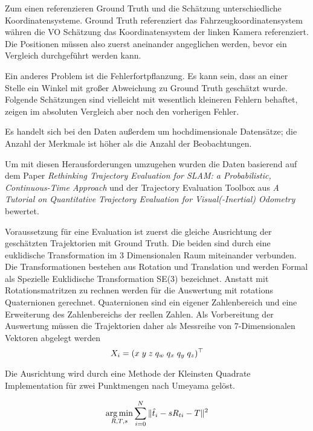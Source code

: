 Zum einen referenzieren Ground Truth und die Schätzung unterschiedliche Koordinatensysteme. Ground Truth referenziert das Fahrzeugkoordinatensystem währen die VO Schätzung das Koordinatensystem der linken Kamera referenziert. Die Positionen müssen also zuerst aneinander angeglichen werden, bevor ein Vergleich durchgeführt werden kann. 
\newline

Ein anderes Problem ist die Fehlerfortpflanzung. Es kann sein, dass an einer Stelle ein Winkel mit gro{\ss}er Abweichung zu Ground Truth geschätzt wurde. Folgende Schätzungen sind vielleicht mit wesentlich kleineren Fehlern behaftet, zeigen im absoluten Vergleich aber noch den vorherigen Fehler. 

Es handelt sich bei den Daten au{\ss}erdem um hochdimensionale Datensätze; die Anzahl der Merkmale ist höher als die Anzahl der Beobachtungen.
\newline

Um mit diesen Herausforderungen umzugehen wurden die Daten basierend auf dem Paper \textit{Rethinking Trajectory Evaluation for SLAM: a Probabilistic, Continuous-Time Approach}\cite{zhangSLAM} und der Trajectory Evaluation Toolbox aus \textit{A Tutorial on Quantitative Trajectory Evaluation for Visual(-Inertial) Odometry} \cite{errorEst} bewertet.
\newline

Voraussetzung für eine Evaluation ist zuerst die gleiche Ausrichtung der geschätzten Trajektorien mit Ground Truth. Die beiden sind durch eine euklidische Transformation im 3 Dimensionalen Raum miteinander verbunden. Die Transformationen bestehen aus Rotation und Translation und werden Formal als Spezielle Euklidische Transformation SE(3) bezeichnet. Anstatt mit Rotationsmatritzen zu rechnen werden für die Auswertung mit rotations Quaternionen gerechnet. Quaternionen sind ein eigener Zahlenbereich und eine Erweiterung des Zahlenbereichs der reellen Zahlen. Als Vorbereitung der Auswertung müssen die Trajektorien daher als Messreihe von 7-Dimensionalen Vektoren abgelegt werden 
\begin{equation}
	\centering
		X_i = (x\; y\; z\; q_w\; q_x\; q_y\; q_z)^\top 
\end{equation}

Die Ausrichtung wird durch eine Methode der Kleinsten Quadrate Implementation für zwei Punktmengen nach Umeyama \cite{Umeyama1991LeastSquaresEO} gelöst.

\begin{equation}
	\centering
	\underset{R,T,s}{\arg\min} \sum_{i = 0}^{N} \| \hat{t}_i -sR_{ti} -T \|^2   
\end{equation}


